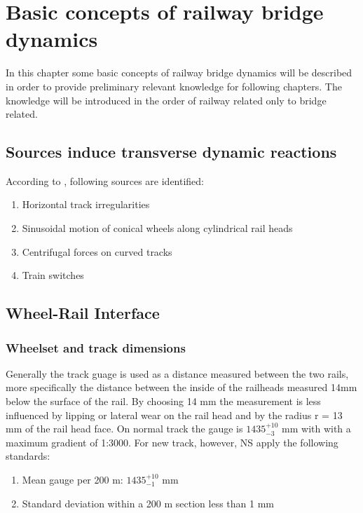 
\chapter{Basic concepts of railway bridge dynamics}

In this chapter some basic concepts of railway bridge dynamics will be described in order to provide preliminary relevant knowledge for following chapters. The knowledge will be introduced in the order of railway related only to bridge related. 

\section{Sources induce transverse dynamic reactions}
According to \cite{da2007dynamic}\cite{fryba1996dynamics}\cite{EC12}, following sources are identified:

\begin{enumerate} [-]
	\item Horizontal track irregularities
	\item Sinusoidal motion of conical wheels along cylindrical rail heads
	\item Centrifugal forces on curved tracks
	\item Train switches
\end{enumerate}

\section{Wheel-Rail Interface}

\subsection{Wheelset and track dimensions}

Generally the track guage is used as a distance measured between the two rails, more specifically the distance between the inside of the railheads measured 14mm below the surface of the rail. By choosing 14 mm the measurement is less influenced by lipping or lateral wear on the rail head and by the radius r = 13 mm of the rail head face. On normal track the gauge is $1435^{+10}_{-3}$ mm with with a maximum gradient of 1:3000. For new track, however, NS apply the following standards:

\begin{enumerate}
\item Mean gauge per 200 m: $1435^{+10}_{-1}$ mm
\item Standard deviation within a 200 m section less than 1 mm
\end{enumerate}

